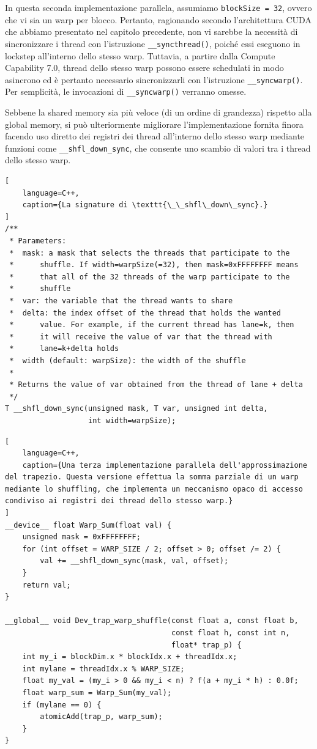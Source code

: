 \begin{note}{}
    In questa seconda implementazione parallela, assumiamo \texttt{blockSize = 32}, ovvero che vi sia un warp per blocco.
    Pertanto, ragionando secondo l'architettura CUDA che abbiamo presentato nel capitolo precedente, non vi sarebbe la necessità di sincronizzare i thread con l'istruzione \texttt{\_\_syncthread()}, poiché essi eseguono in lockstep all'interno dello stesso warp.
    Tuttavia, a partire dalla Compute Capability 7.0, thread dello stesso warp possono essere schedulati in modo asincrono ed è pertanto necessario sincronizzarli con l'istruzione \texttt{\_\_syncwarp()}.
    Per semplicità, le invocazioni di \texttt{\_\_syncwarp()} verranno omesse.
\end{note}

Sebbene la shared memory sia più veloce (di un ordine di grandezza) rispetto alla global memory, si può ulteriormente migliorare l'implementazione fornita finora facendo uso diretto dei registri dei thread all'interno dello stesso warp mediante funzioni come \texttt{\_\_shfl\_down\_sync}, che consente uno scambio di valori tra i thread dello stesso warp.

\begin{lstlisting}[
    language=C++,
    caption={La signature di \texttt{\_\_shfl\_down\_sync}.}
]
/**
 * Parameters:
 *  mask: a mask that selects the threads that participate to the
 *      shuffle. If width=warpSize(=32), then mask=0xFFFFFFFF means 
 *      that all of the 32 threads of the warp participate to the 
 *      shuffle
 *  var: the variable that the thread wants to share
 *  delta: the index offset of the thread that holds the wanted 
 *      value. For example, if the current thread has lane=k, then 
 *      it will receive the value of var that the thread with 
 *      lane=k+delta holds
 *  width (default: warpSize): the width of the shuffle
 *
 * Returns the value of var obtained from the thread of lane + delta
 */
T __shfl_down_sync(unsigned mask, T var, unsigned int delta, 
                   int width=warpSize);
\end{lstlisting}

\begin{lstlisting}[
    language=C++, 
    caption={Una terza implementazione parallela dell'approssimazione del trapezio. Questa versione effettua la somma parziale di un warp mediante lo shuffling, che implementa un meccanismo opaco di accesso condiviso ai registri dei thread dello stesso warp.}
]
__device__ float Warp_Sum(float val) {
    unsigned mask = 0xFFFFFFFF;
    for (int offset = WARP_SIZE / 2; offset > 0; offset /= 2) {
        val += __shfl_down_sync(mask, val, offset);
    }
    return val;
}

__global__ void Dev_trap_warp_shuffle(const float a, const float b, 
                                      const float h, const int n, 
                                      float* trap_p) {
    int my_i = blockDim.x * blockIdx.x + threadIdx.x;
    int mylane = threadIdx.x % WARP_SIZE;
    float my_val = (my_i > 0 && my_i < n) ? f(a + my_i * h) : 0.0f;
    float warp_sum = Warp_Sum(my_val);
    if (mylane == 0) {
        atomicAdd(trap_p, warp_sum);
    }
}
\end{lstlisting}


